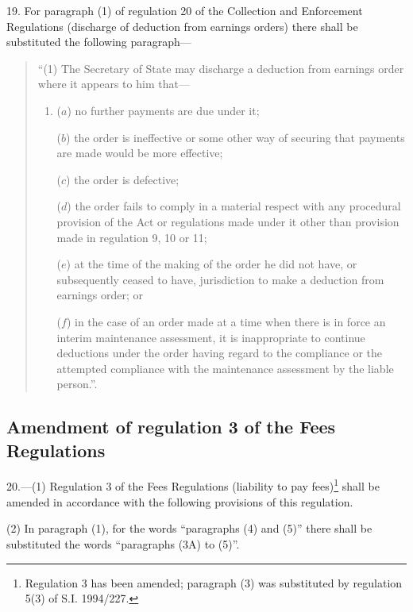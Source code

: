 \documentclass[12pt,a4paper]{article}
\begin{document}
19.  For paragraph (1) of regulation 20 of the Collection and Enforcement Regulations (discharge of deduction from earnings orders) there shall be substituted the following paragraph—
\begin{quotation}
“(1) The Secretary of State may discharge a deduction from earnings order where it appears to him that—
\begin{enumerate}\item[]
($a$) no further payments are due under it;

($b$) the order is ineffective or some other way of securing that payments are made would be more effective;

($c$) the order is defective;

($d$) the order fails to comply in a material respect with any procedural provision of the Act or regulations made under it other than provision made in regulation 9, 10 or 11;

($e$) at the time of the making of the order he did not have, or subsequently ceased to have, jurisdiction to make a deduction from earnings order; or

($f$) in the case of an order made at a time when there is in force an interim maintenance assessment, it is inappropriate to continue deductions under the order having regard to the compliance or the attempted compliance with the maintenance assessment by the liable person.”.
\end{enumerate}
\end{quotation}

\subsection[20. Amendment of regulation 3 of the Fees Regulations]{Amendment of regulation 3 of the Fees Regulations}

20.—(1) Regulation 3 of the Fees Regulations (liability to pay fees)\footnote{\frenchspacing Regulation 3 has been amended; paragraph (3) was substituted by regulation 5(3) of S.I. 1994/227.} shall be amended in accordance with the following provisions of this regulation.

(2) In paragraph (1), for the words “paragraphs (4) and (5)” there shall be substituted the words “paragraphs (3A) to (5)”.
\end{document}
